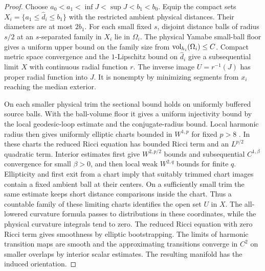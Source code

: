 \begin{proof}
Choose \(a_0<a_1<\inf J<\sup J<b_1<b_0\). Equip the compact sets
\(X_i=\{a_1\le\widehat d_i\le b_1\}\) with the restricted ambient
physical distances. Their diameters are at most \(2b_1\).
For each small fixed \(s\), disjoint distance balls of radius
\(s/2\) at an \(s\)-separated family in \(X_i\) lie in \(\Omega_i\).
The physical Yamabe small-ball floor gives a uniform upper bound on
the family size from \(\operatorname{vol}_{h_i}(\Omega_i)\le C\). Compact metric
space convergence and the \(1\)-Lipschitz bound on \(\widehat d_i\)
give a subsequential limit \(X\) with continuous radial function \(r\).
The inverse image \(U=r^{-1}(J)\) has proper radial function into \(J\).
It is nonempty by minimizing segments from \(x_i\) reaching the
median exterior.

On each smaller physical trim the sectional bound holds on uniformly
buffered source balls. With the ball-volume floor it gives a uniform
injectivity bound by the local geodesic-loop estimate and the
conjugate-radius bound. Local harmonic radius then gives uniformly elliptic
charts bounded in \(W^{1,p}\) for fixed \(p>8\)
\cite[Theorem~4.3 and preceding discussion]{CheegerGromovTaylor1982}
\cite[Theorem~0.3 and the local-domain remarks]{AndersonCheeger1992Harmonic}.
In these charts the reduced Ricci equation has bounded Ricci term and
an \(L^{p/2}\) quadratic term. Interior estimates first give
\(W^{2,p/2}\) bounds and subsequential \(C^{1,\beta}\) convergence
for small \(\beta>0\), and then local weak \(W^{2,q}\) bounds
for finite \(q\). Ellipticity and first exit from a chart imply
that suitably trimmed chart images contain a fixed ambient ball at
their centers. On a sufficiently small trim the same estimate keeps
short distance comparisons inside the chart. Thus a countable family
of these limiting charts identifies the open set \(U\) in \(X\).
The all-lowered curvature formula passes to distributions in these
coordinates, while the physical curvature integrals tend to zero.
The reduced Ricci equation with zero Ricci term gives smoothness by
elliptic bootstrapping. The limits of harmonic transition maps are
smooth and the approximating transitions converge in \(C^2\) on
smaller overlaps by interior scalar estimates. The resulting manifold
has the induced orientation.


\end{proof}
